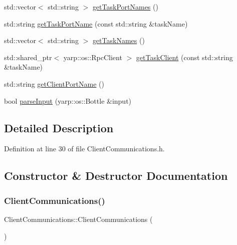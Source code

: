 \begin{DoxyCompactItemize}
\item 
std\+::vector$<$ std\+::string $>$ \hyperlink{classocra__recipes_1_1ClientCommunications_abff3747f063489056f41c99edb7e1e3b}{get\+Task\+Port\+Names} ()
\item 
std\+::string \hyperlink{classocra__recipes_1_1ClientCommunications_ab915047503c4cbddbd26c2036f8340ed}{get\+Task\+Port\+Name} (const std\+::string \&task\+Name)
\item 
std\+::vector$<$ std\+::string $>$ \hyperlink{classocra__recipes_1_1ClientCommunications_a821a74e8c4b20e1d3da18e1cf6b7e31d}{get\+Task\+Names} ()
\item 
std\+::shared\+\_\+ptr$<$ yarp\+::os\+::\+Rpc\+Client $>$ \hyperlink{classocra__recipes_1_1ClientCommunications_ad94eda2ba62336ea95b83622d0837543}{get\+Task\+Client} (const std\+::string \&task\+Name)
\item 
std\+::string \hyperlink{classocra__recipes_1_1ClientCommunications_aa6a6158593016b02b28122903022b0e6}{get\+Client\+Port\+Name} ()
\item 
bool \hyperlink{classocra__recipes_1_1ClientCommunications_ae1d3d48e76010741a8d6f3622191156c}{parse\+Input} (yarp\+::os\+::\+Bottle \&input)
\end{DoxyCompactItemize}


\subsection{Detailed Description}


Definition at line 30 of file Client\+Communications.\+h.



\subsection{Constructor \& Destructor Documentation}
\hypertarget{classocra__recipes_1_1ClientCommunications_a459f2b8ffc37223b303ac0596cccdfd4}{}\label{classocra__recipes_1_1ClientCommunications_a459f2b8ffc37223b303ac0596cccdfd4} 
\subsubsection{\texorpdfstring{Client\+Communications()}{ClientCommunications()}}
{\footnotesize\ttfamily Client\+Communications\+::\+Client\+Communications (\begin{DoxyParamCaption}{ }\end{DoxyParamCaption})}




